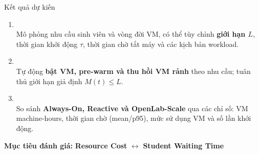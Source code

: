 \begin{frame}{Kết quả dự kiến}
\small
\begin{enumerate}
  \setlength{\itemsep}{0.6em}
  \item \textbf{\color{HCMUTBlue}{Bộ giả lập Virtual Lab}}\\[0.1em]
  Mô phỏng nhu cầu sinh viên và vòng đời VM, có thể tùy chỉnh
  \textbf{giới hạn $L$}, thời gian khởi động $\tau$,
  thời gian chờ tắt máy và các kịch bản workload.

  \item \textbf{\color{HCMUTBlue}{License-Aware Autoscaling Controller}}\\[0.1em]
  Tự động \textbf{bật VM, pre-warm và thu hồi VM rảnh}
  theo nhu cầu; tuân thủ giới hạn giả định $M(t) \leq L$.

  \item \textbf{\color{HCMUTBlue}{Đánh giá định lượng}}\\[0.1em]
  So sánh \textbf{Always-On, Reactive và OpenLab-Scale}
  qua các chỉ số: VM machine-hours, thời gian chờ
  (mean/p95), mức sử dụng VM và số lần khởi động.
\end{enumerate}

\vspace{0.35cm}
\begin{center}
  \textbf{Mục tiêu đánh giá:}
  \textcolor{blue!55!black}{\textbf{Resource Cost}}
  $\longleftrightarrow$
  \textcolor{blue!55!black}{\textbf{Student Waiting Time}}
\end{center}

\end{frame}
